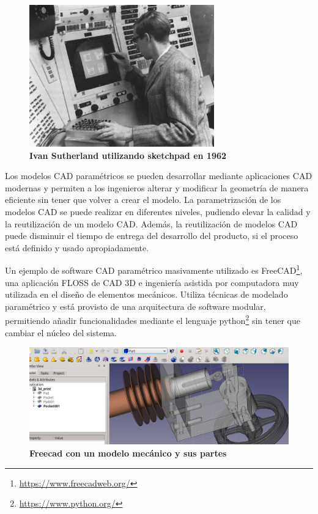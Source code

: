 \begin{figure}[h]
\includegraphics[width=8cm]{Img/GEO/geo-sketchpadc.jpg}
\centering
\caption{\textbf{\footnotesize{Ivan Sutherland utilizando sketchpad en 1962}}}
\end{figure}

Los modelos CAD paramétricos se pueden desarrollar mediante aplicaciones CAD modernas y permiten a los ingenieros alterar y modificar la geometría de manera eficiente sin tener que volver a crear el modelo.
La parametrización de los modelos CAD se puede realizar en diferentes niveles, pudiendo elevar la calidad y la reutilización de un modelo CAD.
Además, la reutilización de modelos CAD puede disminuir el tiempo de entrega del desarrollo del producto, si el proceso está definido y usado apropiadamente\citep{Alfaiate2017}.


Un ejemplo de software CAD paramétrico masivamente utilizado es FreeCAD\footnote{\url{https://www.freecadweb.org/}}, una aplicación FLOSS de CAD 3D e ingeniería asistida por computadora muy utilizada en el diseño de elementos mecánicos. Utiliza técnicas de modelado paramétrico y está provisto de una arquitectura de software modular, permitiendo añadir funcionalidades mediante el lenguaje python\footnote{\url{https://www.python.org/}} sin tener que cambiar el núcleo del sistema.

\begin{figure}[h]
\includegraphics[width=14cm]{Img/CPD/freecad.jpg}
\centering
\caption{\textbf{\footnotesize{Freecad con un modelo mecánico y sus partes}}}
\end{figure}




